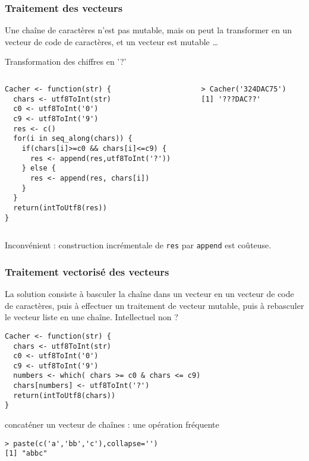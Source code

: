 \documentclass[10pt]{beamer}
\begin{document}
\begin{frame}[fragile]
  \frametitle{Traitement des vecteurs}
  Une chaîne de caractères n’est pas mutable, mais on peut la transformer en un vecteur de code de caractères, et un vecteur est mutable \dots
  \begin{exampleblock}{Transformation des chiffres en '?'}

\begin{columns}[c]
\begin{column}{0.66\textwidth}
    \begin{lstlisting}[style=edblock]
Cacher <- function(str) {
  chars <- utf8ToInt(str)
  c0 <- utf8ToInt('0')
  c9 <- utf8ToInt('9')
  res <- c()
  for(i in seq_along(chars)) {
    if(chars[i]>=c0 && chars[i]<=c9) {
      res <- append(res,utf8ToInt('?'))
    } else {
      res <- append(res, chars[i])
    }
  }
  return(intToUtf8(res))
}
\end{lstlisting}

\end{column}
\begin{column}{0.34\textwidth}
  \begin{lstlisting}
> Cacher('324DAC75')
[1] '???DAC??'
\end{lstlisting}


\end{column}
\end{columns}
\alert{Inconvénient : construction incrémentale de \texttt{res} par \texttt{append} est coûteuse.}
  \end{exampleblock}
\end{frame}



\begin{frame}[fragile]
  \frametitle{Traitement vectorisé des vecteurs }
  La solution consiste à basculer la chaîne dans un vecteur en un vecteur de code de caractères, puis à effectuer un \alert{traitement de vecteur mutable}, puis à rebasculer le vecteur liste en une chaîne. Intellectuel non ?

  \begin{lstlisting}[style=editor]
Cacher <- function(str) {
  chars <- utf8ToInt(str)
  c0 <- utf8ToInt('0')
  c9 <- utf8ToInt('9')
  numbers <- which( chars >= c0 & chars <= c9)
  chars[numbers] <- utf8ToInt('?')
  return(intToUtf8(chars))
}
\end{lstlisting}

\begin{exampleblock}{concaténer un vecteur de chaînes : une opération fréquente}
\begin{lstlisting}[style=block]
> paste(c('a','bb','c'),collapse='')
[1] "abbc"
\end{lstlisting}

\end{exampleblock}
\end{frame}




\end{document}
